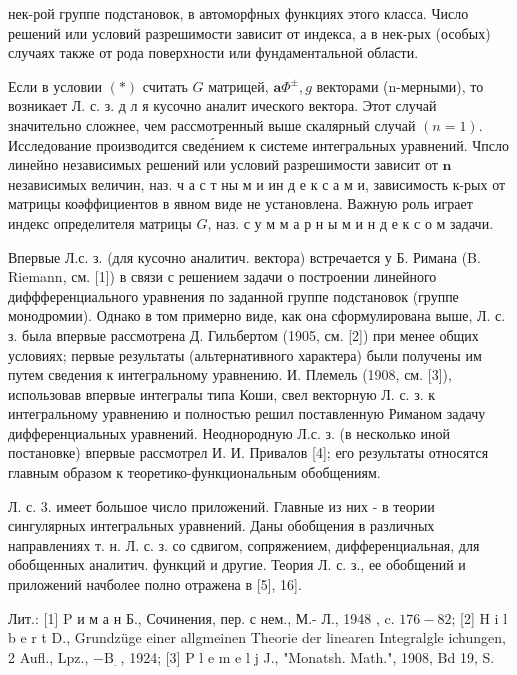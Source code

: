 \documentclass[10pt]{article}
\begin{document}
нек-рой группе подстановок, в автоморфных функциях этого класса. Число решений или условий разрешимости зависит от индекса, а в нек-рых (особых) случаях также от рода поверхности или фундаментальной области.



Если в условии $(*)$ считать $G$ матрицей, $\mathbf{a} \Phi^{ \pm}, g$ векторами (n-мерными), то возникает Л. с. з. д л я кусочно аналит ического вектора. Этот случай значительно сложнее, чем рассмотренный выше скалярный случай $(n=1)$. Исследование производится сведе́нием к системе интегральных уравнений. Чпсло линейно независимых решений или условий разрешимости зависит от $\boldsymbol{n}$ независимых величин, наз. ч а с т ны м и ин д е к с а м и, зависимость к-рых от матрицы коәффициентов в явном виде не установлена. Важную роль играет индекс определителя матрицы $G$, наз. с у м м а р н ы м и н д е к с о м задачи.



Впервые Л.с. з. (для кусочно аналитич. вектора) встречается у Б. Римана (B. Riemann, см. [1]) в связи с решением задачи о построении линейного диффференциального уравнения по заданной группе подстановок (группе монодромии). Однако в том примерно виде, как она сформулирована выше, Л. с. з. была впервые рассмотрена Д. Гильбертом (1905, см. [2]) при менее общих условиях; первые результаты (альтернативного характера) были получены им путем сведения к интегральному уравнению. И. Племель (1908, см. [3]), использовав впервые интегралы типа Коши, свел векторную Л. с. з. к интегральному уравнению и полностью решил поставленную Риманом задачу дифференциальных уравнений. Неоднородную Л.с. з. (в несколько иной постановке) впервые рассмотрел И. И. Привалов [4]; его результаты относятся главным образом к теоретико-функциональным обобщениям.



Л. с. 3. имеет большое число приложений. Главные из них - в теории сингулярных интегральных уравнений. Даны обобщения в различных направлениях т. н. Л. с. з. со сдвигом, сопряжением, дифференциальная, для обобщенных аналитич. функций и другие. Теория Л. с. з., ее обобщений и приложений начболее полно отражена в [5], 16].



Лит.: [1] P и м а н Б., Сочинения, пер. с нем., М.- Л., 1948 , c. $176-82$; [2] H i l b e r t D., Grundzüge einer allgmeinen Theorie der linearen Integralgle ichungen, 2 Aufl., $\mathrm{Lpz}$., $-\mathrm{B}_{\text {. }}$, 1924; [3] P l e m e l j J., "Monatsh. Math.", 1908, Bd 19, S.
\end{document}
